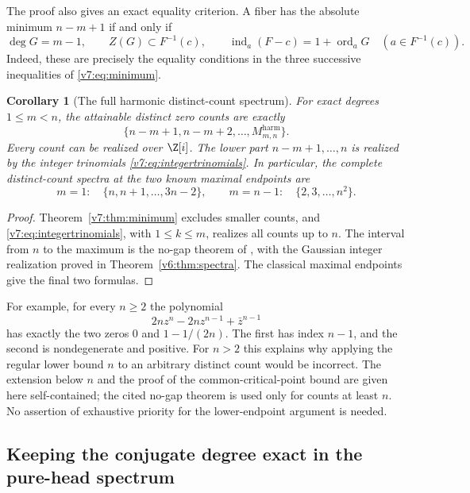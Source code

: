 \documentclass[UTF8,11pt]{ctexart}
\newtheorem{cor}[thm]{Corollary}
\theoremstyle{definition}
\numberwithin{equation}{section}
\DeclareMathOperator{\ord}{ord}\DeclareMathOperator{\Fix}{Fix}
\begin{document}
The proof also gives an exact equality criterion. A fiber has the
absolute minimum $n-m+1$ if and only if
\begin{equation}\label{v7:eq:minequality}
 \deg G=m-1,\qquad Z(G)\subset F^{-1}(c),\qquad
 \operatorname{ind}_a(F-c)=1+\ord_aG\quad(a\in F^{-1}(c)).
\end{equation}
Indeed, these are precisely the equality conditions in the three
successive inequalities of \eqref{v7:eq:minimum}.

\begin{cor}[The full harmonic distinct-count spectrum]
\label{v7:cor:harmonicspectrum}
For exact degrees $1\le m<n$, the attainable distinct zero counts are
exactly
\begin{equation}\label{v7:eq:harmonicspectrum}
 \{n-m+1,n-m+2,\ldots,M^{\mathrm{harm}}_{m,n}\}.
\end{equation}
Every count can be realized over $\Z[i]$. The lower part
$n-m+1,\ldots,n$ is realized by the integer trinomials
\eqref{v7:eq:integertrinomials}. In particular, the complete
distinct-count spectra at the two known maximal endpoints are
\[
 m=1:\quad\{n,n+1,\ldots,3n-2\},\qquad
 m=n-1:\quad\{2,3,\ldots,n^2\}.
\]
\end{cor}
\begin{proof}
Theorem~\ref{v7:thm:minimum} excludes smaller counts, and
\eqref{v7:eq:integertrinomials}, with $1\le k\le m$, realizes
all counts up to $n$. The interval from $n$ to the maximum is
the no-gap theorem of \cite[Theorem~5.4]{SZ21}, with the Gaussian
integer realization proved in Theorem~\ref{v6:thm:spectra}.
The classical maximal endpoints give the final two formulas.
\end{proof}

For example, for every $n\ge2$ the polynomial
\[
 2nz^n-2nz^{n-1}+\bar z^{n-1}
\]
has exactly the two zeros $0$ and $1-1/(2n)$. The first has
index $n-1$, and the second is nondegenerate and positive.
For $n>2$ this explains why applying the regular lower bound $n$
to an arbitrary distinct count would be incorrect.
The extension below $n$ and the proof of the common-critical-point
bound are given here self-contained; the cited no-gap theorem is
used only for counts at least $n$. No assertion of exhaustive
priority for the lower-endpoint argument is needed.

\subsection{Keeping the conjugate degree exact in the pure-head spectrum}
\label{v7:sec:pureexact}
\end{document}
